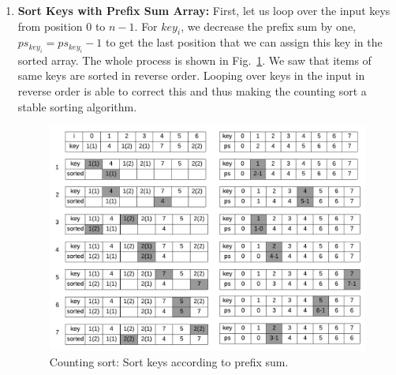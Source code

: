 \documentclass[../main.tex]{subfiles}
\begin{document}
\begin{enumerate}
\item \textbf{Sort Keys with Prefix Sum Array: }  First, let us loop over the input keys from position $0$ to $n-1$. For $key_i$, we decrease the prefix sum by one, $ps_{key_i} = ps_{key_i}-1$ to get the last position that we can assign this key in the sorted array. The whole process is shown in Fig.~\ref{fig:counting_sort}. We saw that items of same keys are sorted in reverse order. Looping over keys in the input in reverse order is able to  correct this and thus making the counting sort a stable sorting algorithm. 
\begin{figure}[!ht]
    \centering
    \includegraphics[width=1.1\columnwidth]{fig/counting_sort.png}
    \caption{Counting sort: Sort keys according to prefix sum.}
        \label{fig:counting_sort}
\end{figure}

\end{enumerate}
 
 
\end{document}
